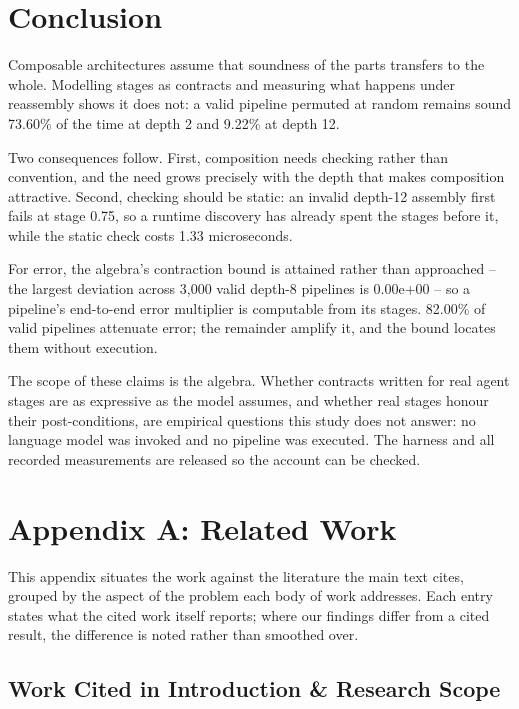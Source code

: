 \documentclass[10pt,journal,compsoc,twocolumn]{IEEEtran}
\begin{document}
\section{Conclusion}


Composable architectures assume that soundness of the parts transfers to the whole. Modelling stages as contracts and measuring what happens under reassembly shows it does not: a valid pipeline permuted at random remains sound 73.60\% of the time at depth 2 and 9.22\% at depth 12.

Two consequences follow. First, composition needs checking rather than convention, and the need grows precisely with the depth that makes composition attractive. Second, checking should be static: an invalid depth-12 assembly first fails at stage 0.75, so a runtime discovery has already spent the stages before it, while the static check costs 1.33 microseconds.

For error, the algebra's contraction bound is attained rather than approached -- the largest deviation across 3,000 valid depth-8 pipelines is 0.00e+00 -- so a pipeline's end-to-end error multiplier is computable from its stages. 82.00\% of valid pipelines attenuate error; the remainder amplify it, and the bound locates them without execution.

The scope of these claims is the algebra. Whether contracts written for real agent stages are as expressive as the model assumes, and whether real stages honour their post-conditions, are empirical questions this study does not answer: no language model was invoked and no pipeline was executed. The harness and all recorded measurements are released so the account can be checked.






\section{Appendix A: Related Work}


This appendix situates the work against the literature the main text cites, grouped by the aspect of the problem each body of work addresses. Each entry states what the cited work itself reports; where our findings differ from a cited result, the difference is noted rather than smoothed over.


\subsection{Work Cited in Introduction \& Research Scope}
\end{document}
